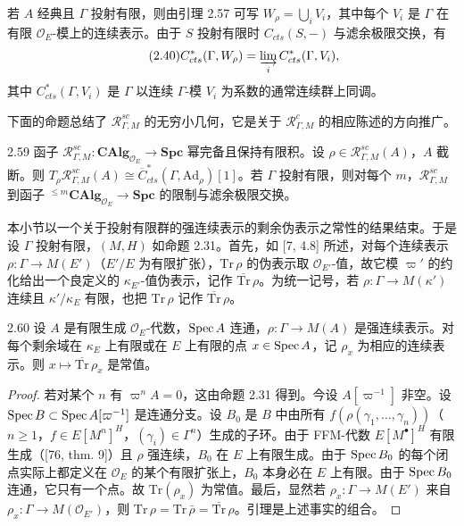若 $A$ 经典且 $\Gamma$ 投射有限，则由引理 2.57 可写 $W_\rho=\bigcup_i V_i$，其中每个 $V_i$ 是 $\Gamma$ 在有限 $\mathcal O_E$-模上的连续表示。由于 $S$ 投射有限时 $C_{cts}(S,-)$ 与滤余极限交换，有
\begin{equation*}\tag{2.40}
C^*_{cts}(\Gamma,W_\rho)=\varinjlim_i C^*_{cts}(\Gamma,V_i),
\end{equation*}
其中 $C^*_{cts}(\Gamma,V_i)$ 是 $\Gamma$ 以连续 $\Gamma$-模 $V_i$ 为系数的通常连续群上同调。

下面的命题总结了 $\mathcal R^{sc}_{\Gamma,M}$ 的无穷小几何，它是关于 $\mathcal R^c_{\Gamma,M}$ 的相应陈述的方向推广。

\begin{prop}{2.59}
函子 $\mathcal R^{sc}_{\Gamma,M}:\mathbf{CAlg}_{\mathcal O_E}\to\mathbf{Spc}$ 幂完备且保持有限积。设 $\rho\in\mathcal R^{sc}_{\Gamma,M}(A)$，$A$ 截断。则 $T_\rho\mathcal R^{sc}_{\Gamma,M}(A)\cong \overline{C}^*_{cts}(\Gamma,\mathrm{Ad}_\rho)[1]$。若 $\Gamma$ 投射有限，则对每个 $m$，$\mathcal R^{sc}_{\Gamma,M}$ 到函子 ${}^{\leq m}\mathbf{CAlg}_{\mathcal O_E}\to\mathbf{Spc}$ 的限制与滤余极限交换。
\end{prop}

本小节以一个关于投射有限群的强连续表示的剩余伪表示之常性的结果结束。于是设 $\Gamma$ 投射有限，$(M,H)$ 如命题 2.31。首先，如 [7, 4.8] 所述，对每个连续表示 $\rho:\Gamma\to M(E')$（$E'/E$ 为有限扩张），$\mathrm{Tr}\,\rho$ 的伪表示取 $\mathcal O_{E'}$-值，故它模 $\varpi'$ 的约化给出一个良定义的 $\kappa_{E'}$-值伪表示，记作 $\overline{\mathrm{Tr}}\,\rho$。为统一记号，若 $\rho:\Gamma\to M(\kappa')$ 连续且 $\kappa'/\kappa_E$ 有限，也把 $\mathrm{Tr}\,\rho$ 记作 $\overline{\mathrm{Tr}}\,\rho$。

\begin{lem}{2.60}
设 $A$ 是有限生成 $\mathcal O_E$-代数，$\operatorname{Spec} A$ 连通，$\rho:\Gamma\to M(A)$ 是强连续表示。对每个剩余域在 $\kappa_E$ 上有限或在 $E$ 上有限的点 $x\in\operatorname{Spec} A$，记 $\rho_x$ 为相应的连续表示。则 $x\mapsto\overline{\mathrm{Tr}}\,\rho_x$ 是常值。
\end{lem}

\begin{proof}
若对某个 $n$ 有 $\varpi^nA=0$，这由命题 2.31 得到。今设 $A[\varpi^{-1}]$ 非空。设 $\operatorname{Spec} B\subset\operatorname{Spec} A[\varpi^{-1}]$ 是连通分支。设 $B_0$ 是 $B$ 中由所有 $f(\rho(\gamma_1,\ldots,\gamma_n))$（$n\geq 1$，$f\in E[M^n]^H$，$(\gamma_i)\in\Gamma^n$）生成的子环。由于 FFM-代数 $E[M^{\bullet}]^H$ 有限生成（[76, thm. 9]）且 $\rho$ 强连续，$B_0$ 在 $E$ 上有限生成。由于 $\operatorname{Spec} B_0$ 的每个闭点实际上都定义在 $\mathcal O_E$ 的某个有限扩张上，$B_0$ 本身必在 $E$ 上有限。由于 $\operatorname{Spec} B_0$ 连通，它只有一个点。故 $\mathrm{Tr}(\rho_x)$ 为常值。最后，显然若 $\rho_x:\Gamma\to M(E')$ 来自 $\rho_x:\Gamma\to M(\mathcal O_{E'})$，则 $\mathrm{Tr}\,\rho=\mathrm{Tr}\,\bar\rho=\overline{\mathrm{Tr}}\,\rho$。引理是上述事实的组合。
\end{proof}

